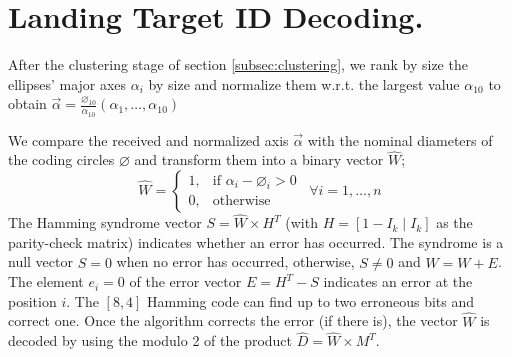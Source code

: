\section{Landing Target ID Decoding.}
After the clustering stage of section \ref{subsec:clustering}, we rank by size the ellipses' major axes $\alpha_i$ by size and normalize them w.r.t. the largest value $\alpha_{10}$ to obtain %
$\vec{\alpha}=  \frac{\diameter_{10}}{\alpha_{10}} (\alpha_{1}, \ldots, \alpha_{10})$

We compare the received and normalized axis $\vec{\alpha}$ with the nominal diameters of the coding circles $\varnothing$ and transform them into a binary vector $\widehat{W}$;
\begin{equation}
\widehat{W}=
\begin{cases}
  1, & \text{if } \alpha_{i}-\diameter_{i} > 0 \\
  0, & \text{otherwise}
\end{cases} \enspace \forall i=1,\ldots, n
\end{equation}
The Hamming syndrome vector $S=\widehat{W}\times H^{T}$ (with $H=[1-I_{k}\mid I_{k}]$ as the parity-check matrix) indicates whether an error has occurred. The syndrome is a null vector $S=0$ when no error has occurred, otherwise, $S\neq 0$ and $\widehat{W}=W+E$. The element $e_{i}=0$ of the error vector $E=H^{T}-S$ indicates an error at the position $i$. The $[8,4]$ Hamming code can find up to two erroneous bits and correct one. Once the algorithm corrects the error (if there is), the vector $\widehat{W}$ is decoded by using the modulo 2 of the product $\widehat{D}=\widehat{W}\times M^{T}$. 

